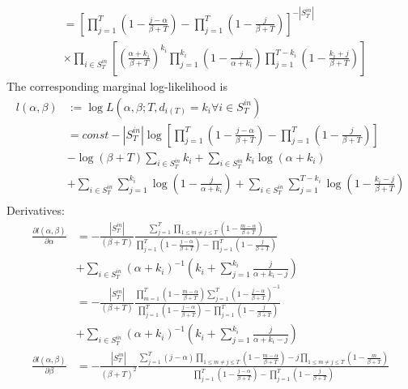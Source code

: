 \documentclass[a4paper, 12pt]{article}
\begin{document}
\begin{itemize}
\begin{align}
        &= \left[\prod_{j=1}^T \left(1 -\frac{j - \alpha}{\beta + T}\right) - \prod_{j=1}^T \left(1 - \frac{j}{\beta + T}\right)\right]^{-|S_T^{in}|} \nonumber \\
        &\times \prod_{i \in S_T^{in}} \left[\left(\frac{\alpha + k_i}{\beta + T}\right)^{k_i} \prod_{j=1}^{k_i}  \left(1 - \frac{j}{\alpha + k_i}\right) \prod_{j=1}^{T - k_i} \left(1 - \frac{k_i + j}{\beta + T}\right) \right]
    \end{align}
    The corresponding marginal log-likelihood is
    \begin{align}
        l(\alpha, \beta) &:= \log L(\alpha, \beta; T, d_{i(T)} = k_i \forall i \in S_T^{in}) \nonumber \\
        &= const - |S_T^{in}|\log\left[\prod_{j=1}^T (1 - \frac{j - \alpha}{\beta + T}) - \prod_{j=1}^T (1 - \frac{j}{\beta + T})\right] \nonumber \\
        &- \log(\beta + T) \sum_{i \in S_T^{in}} k_i + \sum_{i \in S_T^{in}} k_i\log(\alpha + k_i) \nonumber \\
        &+ \sum_{i \in S_T^{in}}\sum_{j = 1}^{k_i} \log(1 - \frac{j}{\alpha + k_i}) + \sum_{i \in S_T^{in}} \sum_{j = 1}^{T - k_i} \log(1 - \frac{k_i - j}{\beta + T}) \nonumber \\
    \end{align}
    Derivatives:
    \begin{align}
        \frac{\partial l(\alpha, \beta)}{\partial \alpha} &= - \frac{|S_T^{in}|}{(\beta + T)}\frac{\sum_{j = 1}^T \prod_{1 \leq m \neq j \leq T} (1 - \frac{m - \alpha}{\beta + T})}{\prod_{j=1}^T (1 - \frac{j - \alpha}{\beta + T}) - \prod_{j=1}^T (1 - \frac{j}{\beta + T})}\nonumber \\
        &+ \sum_{i \in S_T^{in}} (\alpha + k_i)^{-1}\left(k_i + \sum_{j = 1}^{k_i} \frac{j}{\alpha + k_i - j}\right) \nonumber \\
        &= - \frac{|S_T^{in}|}{(\beta + T)} \frac{\prod_{m=1}^T (1 - \frac{m - \alpha}{\beta + T}) \sum_{j = 1}^T (1 - \frac{j - \alpha}{\beta + T})^{-1}}{\prod_{j=1}^T (1 - \frac{j - \alpha}{\beta + T}) - \prod_{j=1}^T (1 - \frac{j}{\beta + T})} \nonumber \\
        &+ \sum_{i \in S_T^{in}} (\alpha + k_i)^{-1}\left(k_i + \sum_{j = 1}^{k_i} \frac{j}{\alpha + k_i - j}\right)  \\
        \frac{\partial l(\alpha, \beta)}{\partial \beta} &= - \frac{|S_T^{in}|}{(\beta + T)^2}\frac{\sum_{j = 1}^T (j - \alpha)\prod_{1 \leq m \neq j \leq T} (1 - \frac{m - \alpha}{\beta + T}) - j\prod_{1 \leq m \neq j \leq T} (1 - \frac{m}{\beta + T})}{\prod_{j=1}^T (1 - \frac{j - \alpha}{\beta + T}) - \prod_{j=1}^T (1 - \frac{j}{\beta + T})}\nonumber \\

\end{align}
\end{itemize}
\end{document}
